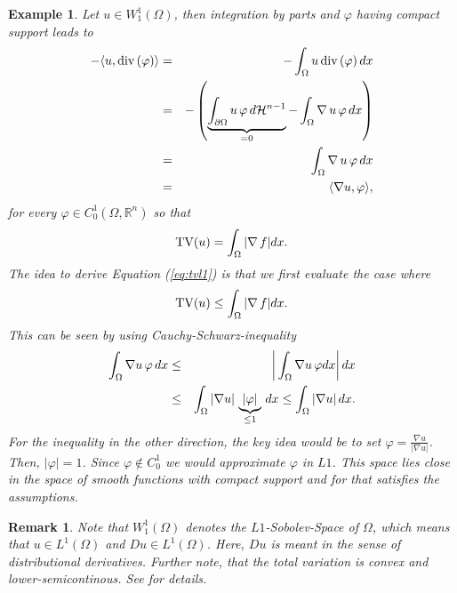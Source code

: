 \documentclass[abstracton]{scrreprt}
\newtheorem{example}[theorem]{Example}
\newtheorem{remark}[theorem]{Remark}
\begin{document}
        \begin{example} %
        \label{prop:u_is_smooth}
            Let $u \in W_{1}^{1}(\Omega)$, then integration by parts and $\varphi$ having compact support leads to
                \begin{eqnarray}
                    -\langle u, \textnormal{div}\,(\varphi) \rangle &=& - \int_{\Omega} u\, \textnormal{div}\, (\varphi)\, dx \notag \\
                    &=& - \left( \underbrace{\int_{\partial\Omega} u\, \varphi\, d\mathcal{H}^{n-1}}_{= 0} - \int_{\Omega} \nabla\,u\, \varphi\, dx \right) \notag \\
                    &=& \int_{\Omega} \nabla\,u\,\varphi\,dx \notag \\
                    &=& \langle \nabla u, \varphi \rangle,
                    \label{eq:nabla_equals_minus_divergence}
                \end{eqnarray}
            for every $\varphi \in C^{1}_{0}(\Omega, \mathbb{R}^{n})$ so that
                \begin{equation}
                    \textnormal{TV}(u) = \int_{\Omega} |\nabla\,f| dx.
                    \label{eq:tvl1}
                \end{equation}
            The idea to derive Equation (\ref{eq:tvl1}) is that we first evaluate the case where
                $$
                    \textnormal{TV}(u) \le \int_{\Omega} |\nabla\,f| dx.
                $$
            This can be seen by using Cauchy-Schwarz-inequality
                \begin{eqnarray}
                    \int_{\Omega} \nabla u \, \varphi \, dx &\le& \bigg| \int_{\Omega} \nabla u \, \varphi dx \bigg| \, dx \notag \\
                    &\le& \int_{\Omega} |\nabla u| \, \underbrace{|\varphi|}_{\le 1} \, dx \le \int_{\Omega} |\nabla u| \, dx. \notag
                \end{eqnarray}
            For the inequality in the other direction, the key idea would be to set $\varphi = \frac{\nabla u}{|\nabla u|}$. Then, $|\varphi| = 1$. Since $\varphi \notin C_{0}^{1}$ we would approximate $\varphi$ in $L1$. This space lies close in the space of smooth functions with compact support and for that satisfies the assumptions.
        \end{example}
        \begin{remark}
            Note that $W_{1}^{1}(\Omega)$ denotes the $L1$-Sobolev-Space of $\Omega$, which means that $u \in L^{1}(\Omega)$ and $Du \in L^{1}(\Omega)$. Here, $Du$ is meant in the sense of distributional derivatives. Further note, that the total variation is convex and lower-semicontinous. See \cite{Chambolle-et-al-10} for details.
        \end{remark}
\end{document}
